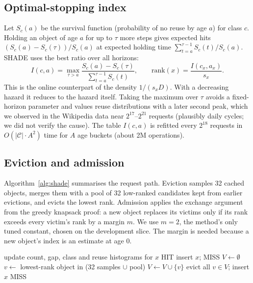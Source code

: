 \documentclass[conference]{IEEEtran}
\begin{document}
\subsection{Optimal-stopping index}
Let $S_c(a)$ be the survival function (probability of no reuse by age $a$) for class $c$. Holding an object of
age $a$ for up to $\tau$ more steps gives expected hits $(S_c(a)-S_c(\tau))/S_c(a)$ at expected holding time
$\sum_{t=a}^{\tau-1}S_c(t)/S_c(a)$. SHADE uses the best ratio over all horizons:
\begin{equation}
I(c,a)=\max_{\tau>a}\frac{S_c(a)-S_c(\tau)}{\sum_{t=a}^{\tau-1}S_c(t)},\qquad
\mathrm{rank}(x)=\frac{I(c_x,a_x)}{s_x}.
\end{equation}
This is the online counterpart of the density $1/(s_x D)$. With a decreasing hazard it reduces to the hazard
itself. Taking the maximum over $\tau$ avoids a fixed-horizon parameter and values reuse distributions with a later
second peak, which we observed in the Wikipedia data near $2^{17}$--$2^{21}$ requests (plausibly daily cycles; we did
not verify the cause). The table $I(c,a)$ is refitted every $2^{18}$ requests in
$O(|\mathcal{C}|\cdot A^2)$ time for $A$ age buckets (about 2M operations).

\subsection{Eviction and admission}
Algorithm~\ref{alg:shade} summarises the request path. Eviction samples 32 cached objects, merges them with a pool
of 32 low-ranked candidates kept from earlier evictions, and evicts the lowest rank. Admission applies the exchange
argument from the greedy knapsack proof: a new object replaces its victims only if its rank exceeds every victim's
rank by a margin $m$. We use $m=2$, the method's only tuned constant, chosen on the development slice. The margin is
needed because a new object's index is an estimate at age $0$.

\begin{algorithm}[t]
\caption{SHADE request handling}\label{alg:shade}
\begin{algorithmic}[1]
  \State update count, gap, class and reuse histograms for $x$
   \State \Return HIT \EndIf
   \State insert $x$; \Return MISS \EndIf
  \State $V\gets\emptyset$
     \State $v\gets$ lowest-rank object in (32 samples $\cup$ pool)
     \State $V\gets V\cup\{v\}$
  \EndWhile
     \State evict all $v\in V$; insert $x$
  \EndIf {}
  \State \Return MISS
\EndProcedure
\end{algorithmic}
\end{algorithm}
\end{document}
